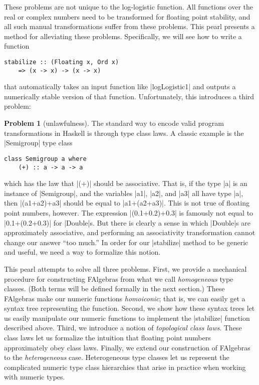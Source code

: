 \documentclass[preprint]{sigplanconf}
\theoremstyle{definition}
\newtheorem{problem}{Problem}
\begin{document}
These problems are not unique to the log-logistic function.
All functions over the real or complex numbers need to be transformed for floating point stability,
and all such manual transformations suffer from these problems.
This pearl presents a method for alleviating these problems.
Specifically, we will see how to write a function
\begin{lstlisting}
stabilize :: (Floating x, Ord x)
    => (x -> x) -> (x -> x)
\end{lstlisting}
that automatically takes an input function like |logLogistic1| and outputs a numerically stable version of that function.
Unfortunately, this introduces a third problem:

\begin{problem}[unlawfulness]
The standard way to encode valid program transformations in Haskell is through type class laws.
A classic example is the |Semigroup| type class
\begin{lstlisting}
class Semigroup a where
    (+) :: a -> a -> a
\end{lstlisting}
which has the law that |(+)| should be associative.
That is, if the type |a| is an instance of |Semigroup|,
and the variables |a1|, |a2|, and |a3| all have type |a|,
then |(a1+a2)+a3| should be equal to |a1+(a2+a3)|.
This is not true of floating point numbers, however.
The expression |(0.1+0.2)+0.3| is famously not equal to |0.1+(0.2+0.3)| for |Double|s.
But there is clearly a sense in which |Double|s are approximately associative,
and performing an associativity transformation cannot change our answer ``too much.''
In order for our |stabilize| method to be generic and useful,
we need a way to formalize this notion.
\end{problem}

This pearl attempts to solve all three problems.
First, we provide a mechanical procedure for constructing FAlgebras from what we call \emph{homogeneous} type classes.
(Both terms will be defined formally in the next section.)
These FAlgebras make our numeric functions \emph{homoiconic};
that is, we can easily get a syntax tree representing the function.
Second, we show how these syntax trees let us easily manipulate our numeric functions to implement the |stabilize| function described above.
Third, we introduce a notion of \emph{topological class laws}.
These class laws let us formalize the intuition that floating point numbers approximately obey class laws.
Finally, we extend our construction of FAlgebras to the \emph{heterogeneous} case.
Heterogeneous type classes let us represent the complicated numeric type class hierarchies that arise in practice when working with numeric types.
\end{document}

